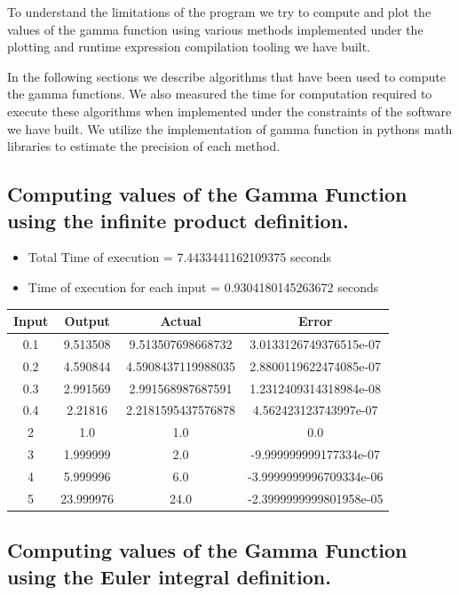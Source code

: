 \documentclass[12pt]{article}
\begin{document}
To understand the limitations of the program we try to compute and plot the values of the gamma function using
various methods implemented under the plotting and runtime expression compilation tooling we have built.

In the following sections we describe algorithms that have been used to compute the gamma functions. We also
measured the time for computation required to execute these algorithms when implemented under the constraints
of the software we have built. We utilize the implementation of gamma function in pythons math libraries 
to estimate the precision of each method.

\pagebreak
\subsection{Computing values of the Gamma Function using the infinite product definition.}

\begin{itemize}
	\item Total Time of execution = 7.4433441162109375 seconds
	\item Time of execution for each input = 0.9304180145263672 seconds
\end{itemize}

\begin{table}[H]
	\centering
	\begin{tabular}{ | c c c c | }
		\hline
		\hline
		Input & Output & Actual & Error\\
		\hline
		\hline
		0.1 & 9.513508 & 9.513507698668732 & 3.0133126749376515e-07\\
		\hline
		0.2 & 4.590844 & 4.5908437119988035 & 2.8800119622474085e-07\\
		\hline
		0.3 & 2.991569 & 2.991568987687591 & 1.2312409314318984e-08\\
		\hline
		0.4 & 2.21816 & 2.2181595437576878 & 4.562423123743997e-07\\
		\hline
		2 & 1.0 & 1.0 & 0.0\\
		\hline
		3 & 1.999999 & 2.0 & -9.999999999177334e-07\\
		\hline
		4 & 5.999996 & 6.0 & -3.9999999996709334e-06\\
		\hline
		5 & 23.999976 & 24.0 & -2.3999999999801958e-05\\
		\hline
		\hline
	\end{tabular}
\end{table}

\subsection{Computing values of the Gamma Function using the Euler integral definition.}
\end{document}
